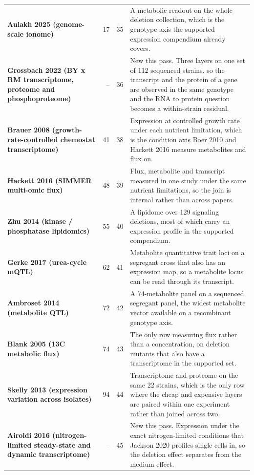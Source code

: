 \begin{longtable}{@{}L{46mm} r@{\hspace{6pt}} r@{\hspace{6pt}} L{104mm}@{}}
\addlinespace[5pt]
\textbf{Aulakh 2025 (genome-scale ionome)} & 17 & 35 & A metabolic readout on the whole deletion collection, which is the genotype axis the supported expression compendium already covers. \\
\addlinespace[5pt]
\textbf{Grossbach 2022 (BY x RM transcriptome, proteome and phosphoproteome)} & -- & 36 & New this pass. Three layers on one set of 112 sequenced strains, so the transcript and the protein of a gene are observed in the same genotype and the RNA to protein question becomes a within-strain residual. \\
\addlinespace[5pt]
\textbf{Brauer 2008 (growth-rate-controlled chemostat transcriptome)} & 41 & 38 & Expression at controlled growth rate under each nutrient limitation, which is the condition axis Boer 2010 and Hackett 2016 measure metabolites and flux on. \\
\addlinespace[5pt]
\textbf{Hackett 2016 (SIMMER multi-omic flux)} & 48 & 39 & Flux, metabolite and transcript measured in one study under the same nutrient limitations, so the join is internal rather than across papers. \\
\addlinespace[5pt]
\textbf{Zhu 2014 (kinase / phosphatase lipidomics)} & 55 & 40 & A lipidome over 129 signaling deletions, most of which carry an expression profile in the supported compendium. \\
\addlinespace[5pt]
\textbf{Gerke 2017 (urea-cycle mQTL)} & 62 & 41 & Metabolite quantitative trait loci on a segregant cross that also has an expression map, so a metabolite locus can be read through its transcript. \\
\addlinespace[5pt]
\textbf{Ambroset 2014 (metabolite QTL)} & 72 & 42 & A 74-metabolite panel on a sequenced segregant panel, the widest metabolite vector available on a recombinant genotype axis. \\
\addlinespace[5pt]
\textbf{Blank 2005 (13C metabolic flux)} & 74 & 43 & The only row measuring flux rather than a concentration, on deletion mutants that also have a transcriptome in the supported set. \\
\addlinespace[5pt]
\textbf{Skelly 2013 (expression variation across isolates)} & 94 & 44 & Transcriptome and proteome on the same 22 strains, which is the only row where the cheap and expensive layers are paired within one experiment rather than joined across two. \\
\addlinespace[5pt]
\textbf{Airoldi 2016 (nitrogen-limited steady-state and dynamic transcriptome)} & -- & 45 & New this pass. Expression under the exact nitrogen-limited conditions that Jackson 2020 profiles single cells in, so the deletion effect separates from the medium effect. \\

\end{longtable}
